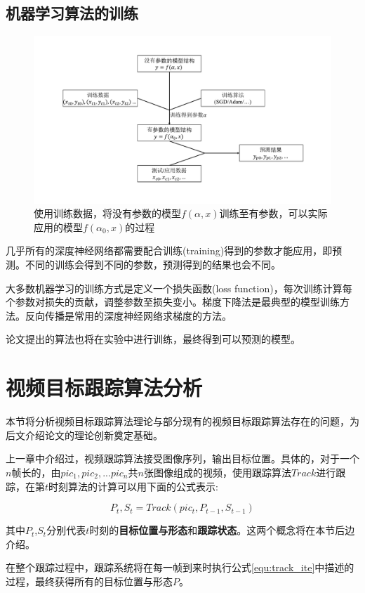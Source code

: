 \subsection{机器学习算法的训练}
\par
\begin{figure}[htbp!]
    \centering
    \includegraphics[width = 1.\textwidth]{chap/img/model_learning.pdf}
    \caption{使用训练数据，将没有参数的模型$f(\alpha,x)$训练至有参数，可以实际应用的模型$f(\alpha_0,x)$的过程}
    \label{fig:model_learning}
\end{figure}
几乎所有的深度神经网络都需要配合训练(training)得到的参数才能应用，即预测。不同的训练会得到不同的参数，预测得到的结果也会不同。
\par
大多数机器学习的训练方式是定义一个损失函数(loss function)，每次训练计算每个参数对损失的贡献，调整参数至损失变小。梯度下降法是最典型的模型训练方法。反向传播是常用的深度神经网络求梯度的方法。
\par
论文提出的算法也将在实验中进行训练，最终得到可以预测的模型。

\section{视频目标跟踪算法分析}
本节将分析视频目标跟踪算法理论与部分现有的视频目标跟踪算法存在的问题，为后文介绍论文的理论创新奠定基础。
\par
上一章中介绍过，视频跟踪算法接受图像序列，输出目标位置。具体的，对于一个$n$帧长的，由$pic_1,pic_2,...pic_n$共$n$张图像组成的视频，使用跟踪算法$Track$进行跟踪，在第$t$时刻算法的计算可以用下面的公式表示:
\par
\begin{equation}\label{equ:track_ite}  P_t,S_t=Track(pic_{t},P_{t-1},S_{t-1})  \end{equation}
\par
其中$P_t$,$S_t$分别代表$t$时刻的\textbf{目标位置与形态}和\textbf{跟踪状态}。这两个概念将在本节后边介绍。
\par
在整个跟踪过程中，跟踪系统将在每一帧到来时执行公式\ref{equ:track_ite}中描述的过程，最终获得所有的目标位置与形态$P$。
\par
